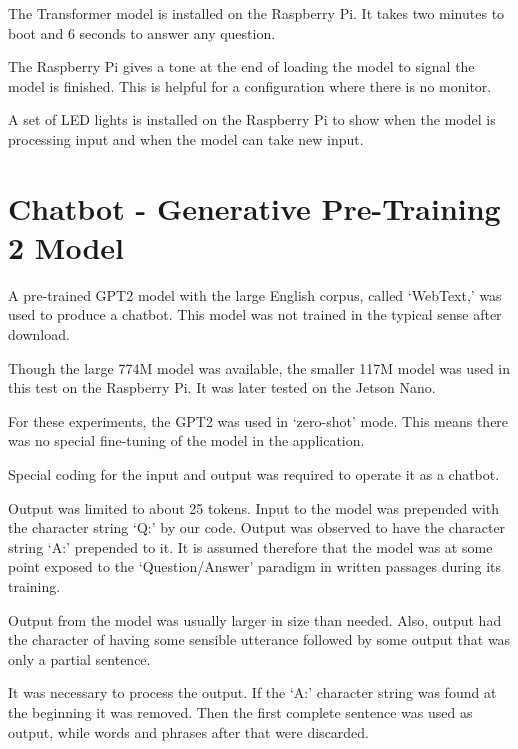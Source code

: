 The Transformer model is installed on the Raspberry Pi. It takes two minutes to boot and 6 seconds to answer any question. 

The Raspberry Pi gives a tone at the end of loading the model to signal the model is finished. %
This is helpful for a configuration where there is no monitor.

A set of LED lights is installed on the Raspberry Pi to show when the model is processing input and when the model can take new input. %


\section{Chatbot - Generative Pre-Training 2 Model}

\label{install-gpt2-chatbot}
A pre-trained GPT2 model with the large English corpus, called `WebText,' was used to produce a chatbot.%
This model was not trained in the typical sense after download. 

Though the large 774M model was available, the smaller 117M model was used in this test on the Raspberry Pi. It was later tested on the Jetson Nano.

For these experiments, the GPT2 was used in `zero-shot' mode. This means there was no special fine-tuning of the model in the application.

Special coding for the input and output was required to operate it as a chatbot. 

Output was limited to about 25 tokens. Input to the model was prepended with the character string `Q:' by our code. Output was observed to have the character string `A:' prepended to it. It is assumed therefore that the model was at some point exposed to the `Question/Answer' paradigm in written passages during its training. %

Output from the model was usually larger in size than needed. Also, output had the character of having some sensible utterance followed by some output that was only a partial sentence.

It was necessary to process the output. 
If the `A:' character string was found at the beginning it was removed.
Then the first complete sentence was used as output, while words and phrases after that were discarded.


